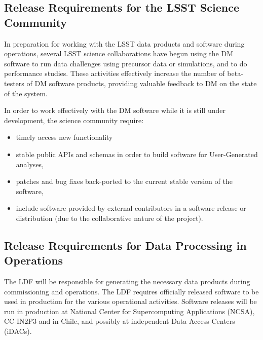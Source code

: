 \subsection{Release Requirements for the \gls{LSST} Science Community} \label{sec:comreqs}

In preparation for working with the \gls{LSST} data products and software during operations, several \gls{LSST} science collaborations have begun using the \gls{DM} software to run data challenges using precursor data or simulations, and to do performance studies. These activities effectively increase the number of beta-testers of \gls{DM} software products, providing valuable feedback to \gls{DM} on the state of the system.

In order to work effectively with the \gls{DM} software while it is still under development, the science community require:
\begin{itemize}
\item timely access new functionality
\item stable public APIs and schemas in order to build software for User-Generated analyses,
\item patches and bug fixes back-ported to the current stable version of the software,
\item include software provided by external contributors in a software release or distribution (due to the collaborative nature of the project).
\end{itemize}


\subsection{Release Requirements for Data Processing in Operations} \label{sec:procreqs}

The \gls{LDF} will be responsible for generating the necessary data products during commissioning and operations.
The \gls{LDF} requires officially released software to be used in production for the various operational activities.
Software releases will be run in production at National \gls{Center} for Supercomputing Applications (\gls{NCSA}), CC-IN2P3 and in Chile, and possibly at independent Data Access Centers (iDACs).

